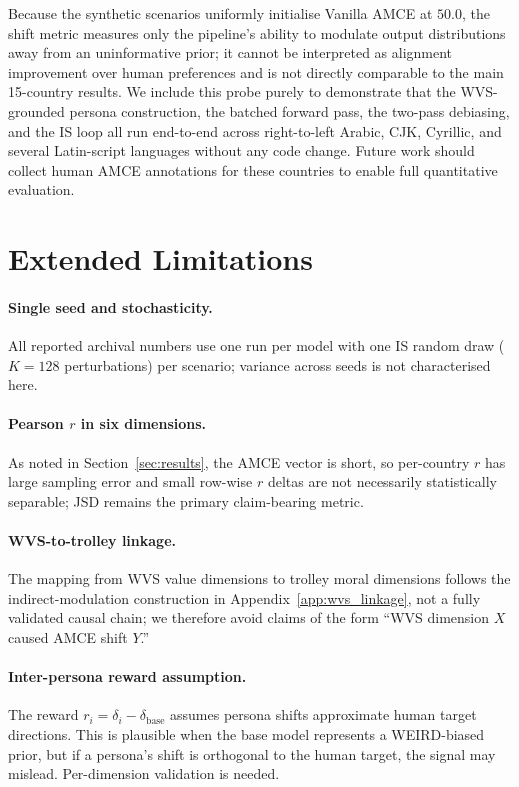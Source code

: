 \documentclass{article}
\begin{document}
Because the synthetic scenarios uniformly initialise Vanilla AMCE at $50.0$, the
shift metric measures only the pipeline's ability to modulate output
distributions away from an uninformative prior; it cannot be interpreted as
alignment improvement over human preferences and is not directly comparable to
the main 15-country results. We include this probe purely to demonstrate that the
WVS-grounded persona construction, the batched forward pass, the two-pass
debiasing, and the IS loop all run end-to-end across right-to-left Arabic,
CJK, Cyrillic, and several Latin-script languages without any code change.
Future work should collect human AMCE annotations for these countries to enable
full quantitative evaluation.

\section{Extended Limitations}
\label{app:limitations}

\paragraph{Single seed and stochasticity.}
All reported archival numbers use one run per model with one IS random draw ($K{=}128$
perturbations) per scenario; variance across seeds is not characterised here.

\paragraph{Pearson $r$ in six dimensions.}
As noted in Section~\ref{sec:results}, the AMCE vector is short, so per-country
$r$ has large sampling error and small row-wise $r$ deltas are not necessarily
statistically separable; JSD remains the primary claim-bearing metric.

\paragraph{WVS-to-trolley linkage.}
The mapping from WVS value dimensions to trolley moral dimensions follows the
indirect-modulation construction in Appendix~\ref{app:wvs_linkage}, not a fully
validated causal chain; we therefore avoid claims of the form ``WVS dimension $X$
caused AMCE shift $Y$.''

\paragraph{Inter-persona reward assumption.}
The reward $r_i = \delta_i - \delta_{\text{base}}$ assumes persona shifts approximate
human target directions. This is plausible when the base model represents a WEIRD-biased
prior, but if a persona's shift is orthogonal to the human target, the signal may
mislead. Per-dimension validation is needed.
\end{document}
